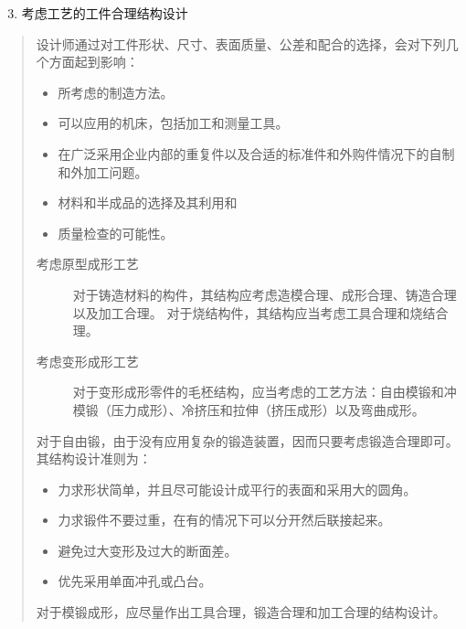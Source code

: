 \documentclass[letterpaper,10pt,english]{sphinxmanual}
\begin{document}
\begin{enumerate}
\setcounter{enumi}{2}
\item {} 
考虑工艺的工件合理结构设计

\end{enumerate}
\begin{quote}

设计师通过对工件形状、尺寸、表面质量、公差和配合的选择，会对下列几个方面起到影响：
\begin{itemize}
\item {} 
所考虑的制造方法。

\item {} 
可以应用的机床，包括加工和测量工具。

\item {} 
在广泛采用企业内部的重复件以及合适的标准件和外购件情况下的自制和外加工问题。

\item {} 
材料和半成品的选择及其利用和

\item {} 
质量检查的可能性。

\end{itemize}
\begin{description}
\item[{考虑原型成形工艺}] \leavevmode
对于铸造材料的构件，其结构应考虑造模合理、成形合理、铸造合理以及加工合理。
对于烧结构件，其结构应当考虑工具合理和烧结合理。

\item[{考虑变形成形工艺}] \leavevmode
对于变形成形零件的毛柸结构，应当考虑的工艺方法：自由模锻和冲模锻（压力成形）、冷挤压和拉伸（挤压成形）以及弯曲成形。

\end{description}

对于自由锻，由于没有应用复杂的锻造装置，因而只要考虑锻造合理即可。其结构设计准则为：
\begin{itemize}
\item {} 
力求形状简单，并且尽可能设计成平行的表面和采用大的圆角。

\item {} 
力求锻件不要过重，在有的情况下可以分开然后联接起来。

\item {} 
避免过大变形及过大的断面差。

\item {} 
优先采用单面冲孔或凸台。

\end{itemize}

对于模锻成形，应尽量作出工具合理，锻造合理和加工合理的结构设计。


\end{quote}
\end{document}
